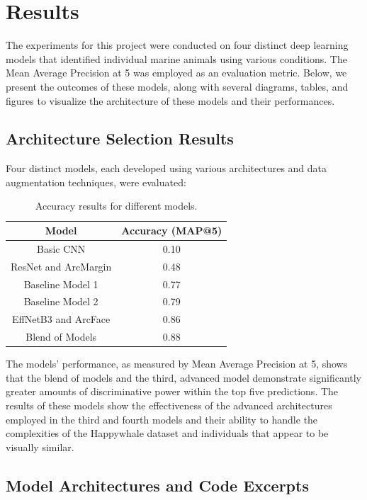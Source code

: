 \documentclass[twocolumn]{article}
\begin{document}
\section{Results}

The experiments for this project were conducted on four distinct deep learning models that identified individual marine animals using various conditions. The Mean Average Precision at 5 was employed as an evaluation metric. Below, we present the outcomes of these models, along with several diagrams, tables, and figures to visualize the architecture of these models and their performances.

\subsection{Architecture Selection Results}

Four distinct models, each developed using various architectures and data augmentation techniques, were evaluated:

\begin{table}[ht!]
\centering
\begin{tabular}{|c|c|}
\hline
\textbf{Model} & \textbf{Accuracy (MAP@5)}\\ 
\hline
Basic CNN & 0.10 \\ 
\hline
ResNet and ArcMargin & 0.48 \\ 
\hline
Baseline Model 1 & 0.77 \\
\hline
Baseline Model 2 & 0.79 \\
\hline
EffNetB3 and ArcFace& 0.86 \\ 
\hline
Blend of Models & 0.88 \\ 
\hline
\end{tabular}
\caption{Accuracy results for different models.}
\label{tab:model_accuracy}
\end{table}

The models’ performance, as measured by Mean Average Precision at 5, shows that the blend of models and the third, advanced model demonstrate significantly greater amounts of discriminative power within the top five predictions. The results of these models show the effectiveness of the advanced architectures employed in the third and fourth models and their ability to handle the complexities of the Happywhale dataset and individuals that appear to be visually similar.

\subsection{Model Architectures and Code Excerpts}
\end{document}
